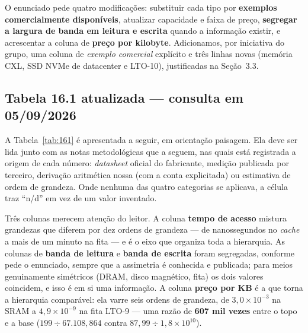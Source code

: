 \documentclass[11pt,a4paper]{article}
\begin{document}
O enunciado pede quatro modificações: substituir cada tipo por \textbf{exemplos
comercialmente disponíveis}, atualizar capacidade e faixa de preço, \textbf{segregar a
largura de banda em leitura e escrita} quando a informação existir, e acrescentar a coluna
de \textbf{preço por kilobyte}. Adicionamos, por iniciativa do grupo, uma coluna de
\emph{exemplo comercial} explícito e três linhas novas (memória CXL, SSD NVMe de datacenter
e LTO-10), justificadas na Seção~3.3.

\subsection{Tabela 16.1 atualizada --- consulta em 05/09/2026}

A Tabela~\ref{tab:161} é apresentada a seguir, em orientação paisagem. Ela deve ser
lida junto com as notas metodológicas que a seguem, nas quais está registrada a origem de cada
número: \emph{datasheet} oficial do fabricante, medição publicada por terceiro, derivação
aritmética nossa (com a conta explicitada) ou estimativa de ordem de grandeza. Onde nenhuma
das quatro categorias se aplicava, a célula traz ``n/d'' em vez de um valor inventado.

Três colunas merecem atenção do leitor. A coluna \textbf{tempo de acesso} mistura grandezas
que diferem por dez ordens de grandeza --- de nanossegundos no \emph{cache} a mais de um
minuto na fita --- e é o eixo que organiza toda a hierarquia. As colunas de \textbf{banda de
leitura} e \textbf{banda de escrita} foram segregadas, conforme pede o enunciado, sempre que
a assimetria é conhecida e publicada; para meios genuinamente simétricos (DRAM, disco
magnético, fita) os dois valores coincidem, e isso é em si uma informação. A coluna
\textbf{preço por KB} é a que torna a hierarquia comparável: ela varre seis ordens de
grandeza, de $3{,}0\times10^{-3}$ na SRAM a $4{,}9\times10^{-9}$ na fita LTO-9 --- uma razão
de \textbf{607 mil vezes} entre o topo e a base ($199 \div 67{.}108{,}864$ contra
$87{,}99 \div 1{,}8\times10^{10}$).
\end{document}
